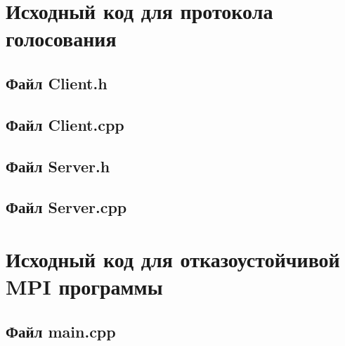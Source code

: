 \documentclass[a4paper,12pt,titlepage,finall]{article}
\begin{document}
\section{Исходный код для протокола голосования}\label{votesource}
\subsection{Файл Client.h}

\newpage
\subsection{Файл Client.cpp}

\newpage
\subsection{Файл Server.h}

\newpage
\subsection{Файл Server.cpp}

\newpage
\section{Исходный код для отказоустойчивой MPI программы}\label{ulfmsource}
\subsection{Файл main.cpp}

\end{document}
